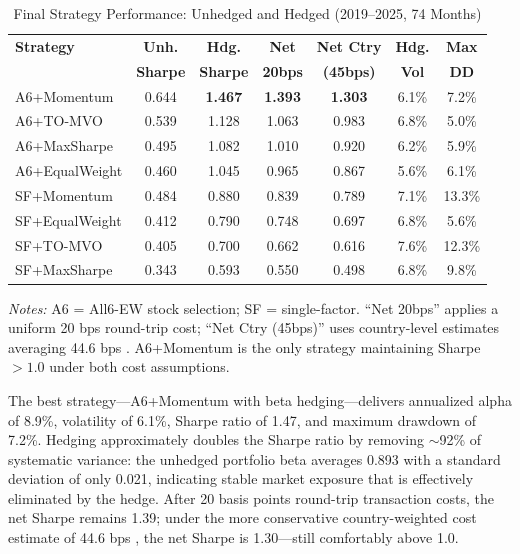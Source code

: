 \documentclass[12pt]{article}
\begin{document}
\begin{table}[H]
\centering
\caption{Final Strategy Performance: Unhedged and Hedged (2019--2025, 74 Months)}
\label{tab:hedged}
\small
\begin{tabular}{lcccccc}
\toprule
\textbf{Strategy} & \textbf{Unh.} & \textbf{Hdg.} & \textbf{Net} & \textbf{Net Ctry} & \textbf{Hdg.} & \textbf{Max} \\
 & \textbf{Sharpe} & \textbf{Sharpe} & \textbf{20bps} & \textbf{(45bps)} & \textbf{Vol} & \textbf{DD} \\
\midrule
A6+Momentum    & 0.644 & \textbf{1.467} & \textbf{1.393} & \textbf{1.303} & 6.1\% & 7.2\% \\
A6+TO-MVO      & 0.539 & 1.128 & 1.063 & 0.983  & 6.8\% & 5.0\% \\
A6+MaxSharpe   & 0.495 & 1.082 & 1.010 & 0.920  & 6.2\% & 5.9\% \\
A6+EqualWeight & 0.460 & 1.045 & 0.965 & 0.867  & 5.6\% & 6.1\% \\
SF+Momentum    & 0.484 & 0.880 & 0.839 & 0.789  & 7.1\% & 13.3\% \\
SF+EqualWeight & 0.412 & 0.790 & 0.748 & 0.697  & 6.8\% & 5.6\% \\
SF+TO-MVO      & 0.405 & 0.700 & 0.662 & 0.616  & 7.6\% & 12.3\% \\
SF+MaxSharpe   & 0.343 & 0.593 & 0.550 & 0.498  & 6.8\% & 9.8\% \\
\bottomrule
\end{tabular}
\begin{minipage}{0.92\textwidth}
\vspace{0.3em}
\footnotesize
\textit{Notes:} A6 = All6-EW stock selection; SF = single-factor. ``Net 20bps'' applies a uniform 20 bps round-trip cost; ``Net Ctry (45bps)'' uses country-level estimates averaging 44.6 bps \citep{domowitz2001}. A6+Momentum is the only strategy maintaining Sharpe $> 1.0$ under both cost assumptions.
\end{minipage}
\end{table}

The best strategy---A6+Momentum with beta hedging---delivers annualized alpha of 8.9\%, volatility of 6.1\%, Sharpe ratio of 1.47, and maximum drawdown of 7.2\%. Hedging approximately doubles the Sharpe ratio by removing $\sim$92\% of systematic variance: the unhedged portfolio beta averages 0.893 with a standard deviation of only 0.021, indicating stable market exposure that is effectively eliminated by the hedge. After 20 basis points round-trip transaction costs, the net Sharpe remains 1.39; under the more conservative country-weighted cost estimate of 44.6 bps \citep{domowitz2001}, the net Sharpe is 1.30---still comfortably above 1.0.
\end{document}
